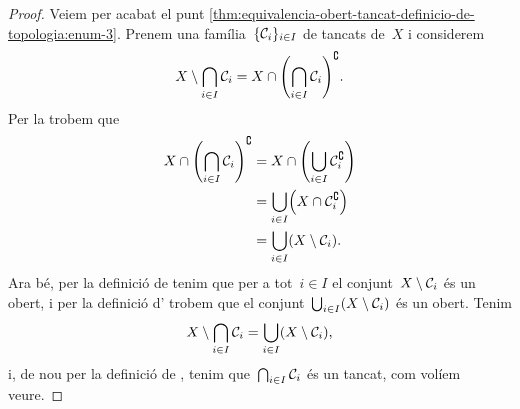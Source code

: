 \documentclass[../../main.tex]{subfiles}
\begin{document}
\begin{proof}
        Veiem per acabat el punt \eqref{thm:equivalencia-obert-tancat-definicio-de-topologia:enum-3}.
        Prenem una família~\(\{\mathcal{C}_{i}\}_{i\in I}\) de tancats de~\(X\) i considerem
        \[
            X\setminus\bigcap_{i\in I}\tancat{C}_{i}=X\cap\left(\bigcap_{i\in I}\tancat{C}_{i}\right)^{\complement}.
        \]
        Per la  trobem que
        \begin{align*}
            X\cap\left(\bigcap_{i\in I}\tancat{C}_{i}\right)^{\complement}&=X\cap\left(\bigcup_{i\in I}\tancat{C}_{i}^{\complement}\right) \\
            &=\bigcup_{i\in I}\left(X\cap\tancat{C}_{i}^{\complement}\right) \\
            &=\bigcup_{i\in I}\left(X\setminus\tancat{C}_{i}\right).
        \end{align*}
        Ara bé, per la definició de  tenim que per a tot~\(i\in I\) el conjunt~\(X\setminus\mathcal{C}_{i}\) és un obert, i per la definició d' trobem que el conjunt~\(\bigcup_{i\in I}\left(X\setminus\tancat{C}_{i}\right)\) és un obert.
        Tenim
        \[
            X\setminus\bigcap_{i\in I}\tancat{C}_{i}=\bigcup_{i\in I}\left(X\setminus\tancat{C}_{i}\right),
        \]
        i, de nou per la definició de , tenim que~\(\bigcap_{i\in I}\mathcal{C}_{i}\) és un tancat, com volíem veure.
    \end{proof}
\end{document}
